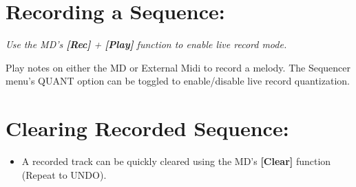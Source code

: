 \section{Recording a Sequence:}
\textit{Use the MD's \textbf{\textit{[Rec]}} + \textbf{[\textbf{Play}]} function to enable live record mode.\\}

Play notes on either the MD or External Midi to record a melody. The Sequencer menu's QUANT option can be toggled to enable/disable live record quantization.

\section{Clearing Recorded Sequence:}
\begin{itemize}
\item A recorded track can be quickly cleared using the MD's \textbf{[Clear]} function (Repeat to UNDO).
\end{itemize}

